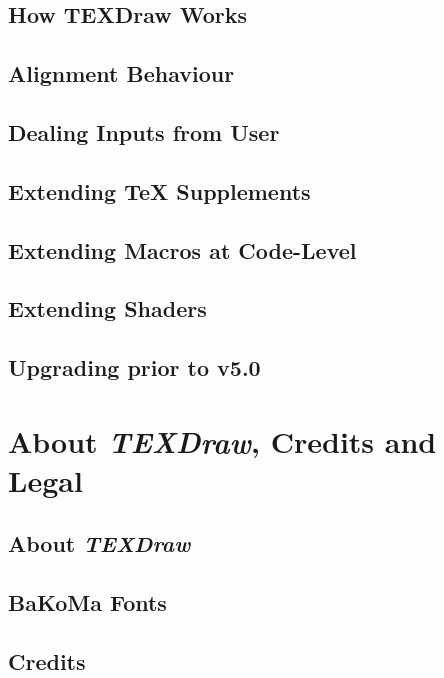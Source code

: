 \documentclass[12pt]{article}
\def\TEXDraw{\textit{TEXDraw}}
\begin{document}
 	\subsection{How TEXDraw Works}
 	
 	\subsection{Alignment Behaviour}
 	
 	\subsection{Dealing Inputs from User}
 	
 	\subsection{Extending TeX Supplements}
 	
 	\subsection{Extending Macros at Code-Level}
 	
 	\subsection{Extending Shaders}
 	
 	\subsection{Upgrading prior to v5.0}
 	
 	\section{About \TEXDraw, Credits and Legal}
 	
 	\subsection{About \TEXDraw}
 	
 	\subsection{BaKoMa Fonts}
 	
 	\subsection{Credits}
 	
\end{document}
